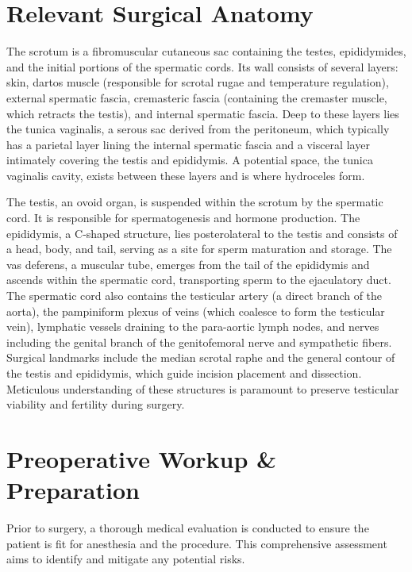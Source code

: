 \section*{Relevant Surgical Anatomy}
The scrotum is a fibromuscular cutaneous sac containing the testes, epididymides, and the initial portions of the spermatic cords. Its wall consists of several layers: skin, dartos muscle (responsible for scrotal rugae and temperature regulation), external spermatic fascia, cremasteric fascia (containing the cremaster muscle, which retracts the testis), and internal spermatic fascia. Deep to these layers lies the tunica vaginalis, a serous sac derived from the peritoneum, which typically has a parietal layer lining the internal spermatic fascia and a visceral layer intimately covering the testis and epididymis. A potential space, the tunica vaginalis cavity, exists between these layers and is where hydroceles form.

The testis, an ovoid organ, is suspended within the scrotum by the spermatic cord. It is responsible for spermatogenesis and hormone production. The epididymis, a C-shaped structure, lies posterolateral to the testis and consists of a head, body, and tail, serving as a site for sperm maturation and storage. The vas deferens, a muscular tube, emerges from the tail of the epididymis and ascends within the spermatic cord, transporting sperm to the ejaculatory duct. The spermatic cord also contains the testicular artery (a direct branch of the aorta), the pampiniform plexus of veins (which coalesce to form the testicular vein), lymphatic vessels draining to the para-aortic lymph nodes, and nerves including the genital branch of the genitofemoral nerve and sympathetic fibers. Surgical landmarks include the median scrotal raphe and the general contour of the testis and epididymis, which guide incision placement and dissection. Meticulous understanding of these structures is paramount to preserve testicular viability and fertility during surgery.

\section*{Preoperative Workup \& Preparation}
Prior to surgery, a thorough medical evaluation is conducted to ensure the patient is fit for anesthesia and the procedure. This comprehensive assessment aims to identify and mitigate any potential risks.


